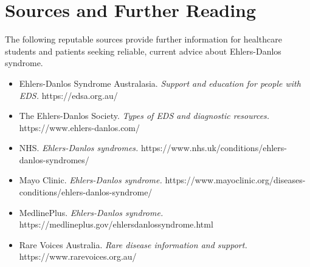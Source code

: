 \section*{Sources and Further Reading}
The following reputable sources provide further information for healthcare students and patients seeking reliable, current advice about Ehlers-Danlos syndrome.
\begin{itemize}
    \item Ehlers-Danlos Syndrome Australasia. \textit{Support and education for people with EDS.} https://edsa.org.au/
    \item The Ehlers-Danlos Society. \textit{Types of EDS and diagnostic resources.} https://www.ehlers-danlos.com/
    \item NHS. \textit{Ehlers-Danlos syndromes.} https://www.nhs.uk/conditions/ehlers-danlos-syndromes/
    \item Mayo Clinic. \textit{Ehlers-Danlos syndrome.} https://www.mayoclinic.org/diseases-conditions/ehlers-danlos-syndrome/
    \item MedlinePlus. \textit{Ehlers-Danlos syndrome.} https://medlineplus.gov/ehlersdanlossyndrome.html
    \item Rare Voices Australia. \textit{Rare disease information and support.} https://www.rarevoices.org.au/
\end{itemize}
